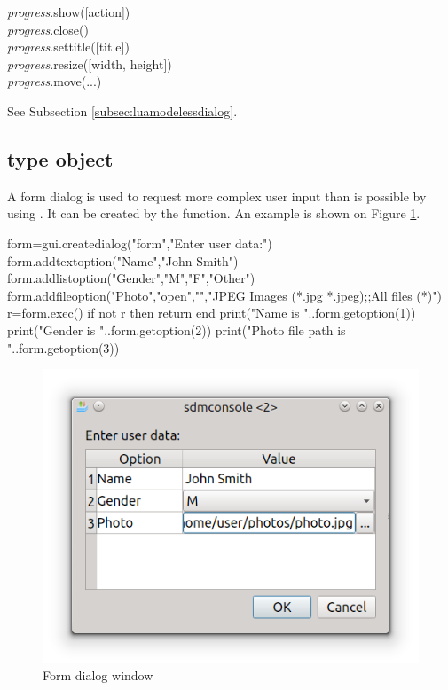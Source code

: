 \documentclass[a4paper,12pt,twoside,extrafontsizes]{memoir}
\begin{document}

\begin{luafuncprototype}
\emph{progress}.show([action]) \\
\emph{progress}.close() \\
\emph{progress}.settitle([title]) \\
\emph{progress}.resize([width, height]) \\
\emph{progress}.move(...)
\end{luafuncprototype}

\begin{funcdescr}
	See Subsection \ref{subsec:luamodelessdialog}.
\end{funcdescr}

\subsection{ type object}
\label{subsec:formdialog}

A form dialog is used to request more complex user input than is possible by using . It can be created by the  function. An example is shown on Figure \ref{fig:formdialog}.

\begin{shellcmds}\begin{luacode}
form=gui.createdialog("form","Enter user data:")
form.addtextoption("Name","John Smith")
form.addlistoption("Gender",{"M","F","Other"})
form.addfileoption("Photo","open","","JPEG Images (*.jpg *.jpeg);;All files (*)")
r=form.exec()
if not r then return end
print("Name is "..form.getoption(1))
print("Gender is "..form.getoption(2))
print("Photo file path is "..form.getoption(3))
\end{luacode}\end{shellcmds}

\begin{figure}[htbp]
\centering
\includegraphics{images/formdialog.png}
\caption{Form dialog window}
\label{fig:formdialog}
\end{figure}
\end{document}
